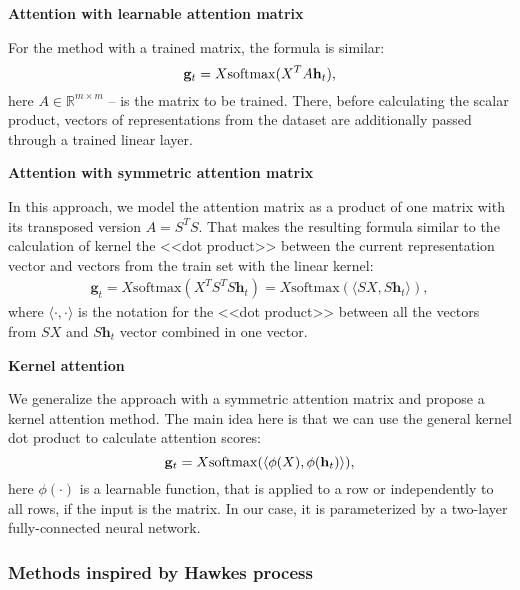 \textbf{Attention with learnable attention matrix}

For the method with a trained matrix, the formula is similar:
\begin{equation}
     \mathbf{g}_t = X \mathrm{softmax} (X^T A \mathbf{h}_t),
\end{equation}
here $A \in \mathbb{R}^{m \times m}$ -- is the matrix to be trained.
There, before calculating the scalar product, vectors of representations from the dataset are additionally passed through a trained linear layer. 

\textbf{Attention with symmetric attention matrix}

In this approach, we model the attention matrix as a product of one matrix with  its transposed version $A = S^T S$.
That makes the resulting formula similar to the calculation of kernel the <<dot product>> between the current representation vector and vectors from the train set with the linear kernel:
\begin{equation}
\begin{split}
      \mathbf{g}_t = X \mathrm{softmax} (X^T S^T S \mathbf{h}_t) = X \mathrm{softmax} (\langle S X, S \mathbf{h}_t \rangle),
\end{split}
\end{equation}
where $\langle \cdot, \cdot \rangle$ is the notation for the <<dot product>> between all the vectors from $SX$ and $S\mathbf{h}_t$ vector combined in one vector.

\textbf{Kernel attention}

We generalize the approach with a symmetric attention matrix and propose a kernel attention method. The main idea here is that we can use the general kernel dot product to calculate attention scores:
\begin{equation}
     \mathbf{g}_t = X \mathrm{softmax} (\langle \phi(X), \phi(\mathbf{h}_t) \rangle),
\end{equation}
here $\phi(\cdot)$ is a learnable function, that is applied to a row or independently to all rows, if the input is the matrix. In our case, it is parameterized by a two-layer fully-connected neural network.

\subsubsection{Methods inspired by Hawkes process}
~

